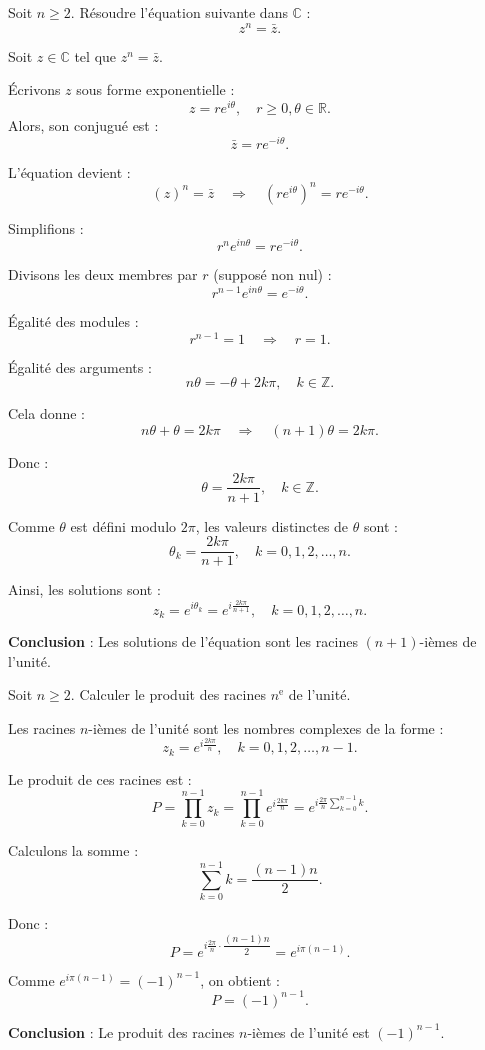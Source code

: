 \documentclass[a4paper,12pt]{article}
\begin{document}
\begin{tcolorbox}[title=Exercice 10 - {[}Calculer{]}]
Soit \( n \geq 2 \). Résoudre l’équation suivante dans \( \mathbb{C} \) :
\[
z^n = \bar{z}.
\]
\end{tcolorbox}

\begin{solutionbox}
Soit \( z \in \mathbb{C} \) tel que \( z^n = \bar{z} \).

Écrivons \( z \) sous forme exponentielle :
\[
z = r e^{i\theta}, \quad r \geq 0, \theta \in \mathbb{R}.
\]
Alors, son conjugué est :
\[
\bar{z} = r e^{-i\theta}.
\]

L'équation devient :
\[
(z)^n = \bar{z} \quad \Rightarrow \quad (r e^{i\theta})^n = r e^{-i\theta}.
\]

Simplifions :
\[
r^n e^{in\theta} = r e^{-i\theta}.
\]

Divisons les deux membres par \( r \) (supposé non nul) :
\[
r^{n-1} e^{in\theta} = e^{-i\theta}.
\]

Égalité des modules :
\[
r^{n-1} = 1 \quad \Rightarrow \quad r = 1.
\]

Égalité des arguments :
\[
n\theta = -\theta + 2k\pi, \quad k \in \mathbb{Z}.
\]

Cela donne :
\[
n\theta + \theta = 2k\pi \quad \Rightarrow \quad (n + 1)\theta = 2k\pi.
\]

Donc :
\[
\theta = \dfrac{2k\pi}{n+1}, \quad k \in \mathbb{Z}.
\]

Comme \( \theta \) est défini modulo \( 2\pi \), les valeurs distinctes de \( \theta \) sont :
\[
\theta_k = \dfrac{2k\pi}{n+1}, \quad k = 0, 1, 2, \dots, n.
\]

Ainsi, les solutions sont :
\[
z_k = e^{i\theta_k} = e^{i\frac{2k\pi}{n+1}}, \quad k = 0, 1, 2, \dots, n.
\]

\textbf{Conclusion} : Les solutions de l'équation sont les racines \((n+1)\)-ièmes de l'unité.
\end{solutionbox}

\begin{tcolorbox}[title=Exercice 11 - {[}Calculer{]}]
Soit \( n \geq 2 \). Calculer le produit des racines \( n^{\text{e}} \) de l’unité.
\end{tcolorbox}

\begin{solutionbox}
Les racines \( n \)-ièmes de l'unité sont les nombres complexes de la forme :
\[
z_k = e^{i\frac{2k\pi}{n}}, \quad k = 0, 1, 2, \dots, n-1.
\]

Le produit de ces racines est :
\[
P = \prod_{k=0}^{n-1} z_k = \prod_{k=0}^{n-1} e^{i\frac{2k\pi}{n}} = e^{i\frac{2\pi}{n} \sum_{k=0}^{n-1} k}.
\]

Calculons la somme :
\[
\sum_{k=0}^{n-1} k = \dfrac{(n-1)n}{2}.
\]

Donc :
\[
P = e^{i\frac{2\pi}{n} \cdot \dfrac{(n-1)n}{2}} = e^{i\pi(n-1)}.
\]

Comme \( e^{i\pi(n-1)} = (-1)^{n-1} \), on obtient :
\[
P = (-1)^{n-1}.
\]

\textbf{Conclusion} : Le produit des racines \( n \)-ièmes de l'unité est \( (-1)^{n-1} \).
\end{solutionbox}
\end{document}
